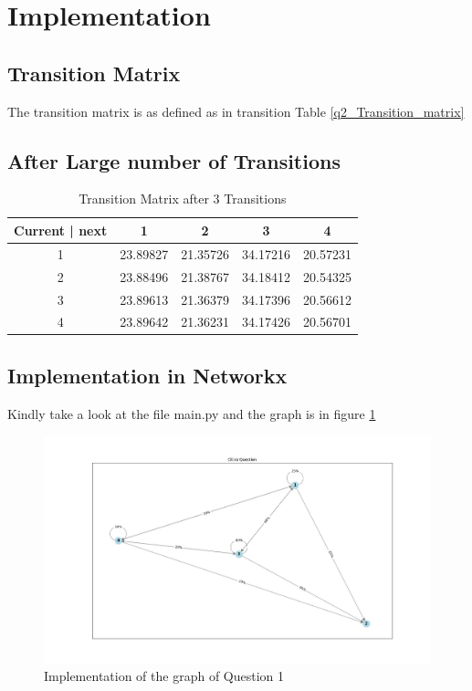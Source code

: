\documentclass{article}
\begin{document}
\section{Implementation}
\subsection{Transition Matrix}
The transition matrix is as defined as in transition Table \ref{q2_Transition_matrix}
\subsection{After Large number of Transitions}
\begin{table}[H]
    \centering
    \begin{tabular}{|c | c | c | c| c|}
        \hline
        Current | next & 1 & 2 & 3 & 4\\ 
        \hline
      1 & 23.89827 & 21.35726 & 34.17216 & 20.57231 \\
      2 & 23.88496 & 21.38767 & 34.18412 & 20.54325 \\
      3 & 23.89613 & 21.36379 & 34.17396 & 20.56612 \\
      4 & 23.89642 & 21.36231 & 34.17426 & 20.56701 \\
        \hline
    \end{tabular}
    \caption{Transition Matrix after 3 Transitions}
    \label{q2_Transition_matrix_many_transitions}
    
\end{table}
\subsection{Implementation in Networkx}
Kindly take a look at the file main.py and the graph is in figure \ref{q2_markovChain_python}
\begin{figure}[H]
    \centering
    \includegraphics[width=\linewidth]{nodes.jpg}
        \caption{Implementation of the graph of Question 1}

    \label{q2_markovChain_python}
\end{figure}
\end{document}
